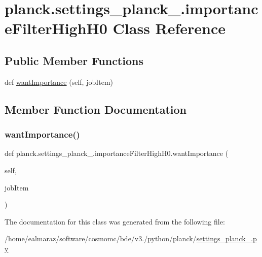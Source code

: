 \hypertarget{classplanck_1_1settings__planck__2015_1_1importanceFilterHighH0}{}\section{planck.\+settings\+\_\+planck\+\_.\+importance\+Filter\+High\+H0 Class Reference}
\label{classplanck_1_1settings__planck__2015_1_1importanceFilterHighH0}
\subsection*{Public Member Functions}
\begin{DoxyCompactItemize}
\item 
def \mbox{\hyperlink{classplanck_1_1settings__planck__2015_1_1importanceFilterHighH0_a825e9efdc1bda503cdf06e45666f7e0c}{want\+Importance}} (self, job\+Item)
\end{DoxyCompactItemize}


\subsection{Member Function Documentation}
\mbox{\label{classplanck_1_1settings__planck__2015_1_1importanceFilterHighH0_a825e9efdc1bda503cdf06e45666f7e0c}} 
\subsubsection{\texorpdfstring{want\+Importance()}{wantImportance()}}
{\footnotesize\ttfamily def planck.\+settings\+\_\+planck\+\_.\+importance\+Filter\+High\+H0.\+want\+Importance (\begin{DoxyParamCaption}\item[{}]{self,  }\item[{}]{job\+Item }\end{DoxyParamCaption})}



The documentation for this class was generated from the following file\+:\begin{DoxyCompactItemize}
\item 
/home/ealmaraz/software/cosmomc/bde/v3./python/planck/\mbox{\hyperlink{settings__planck__2015_8py}{settings\+\_\+planck\+\_.\+py}}\end{DoxyCompactItemize}
